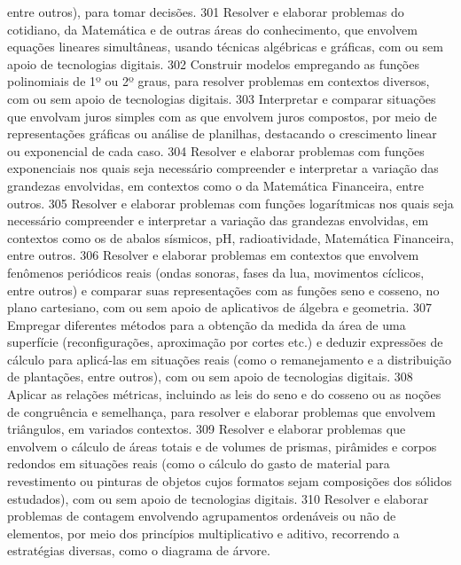 {{{				entre outros), para tomar decisões.
			}{301}{%
				Resolver e elaborar problemas do cotidiano, da Matemática e de outras
				áreas do conhecimento, que envolvem equações lineares simultâneas, usando técnicas
				algébricas e gráficas, com ou sem apoio de tecnologias digitais.
			}{302}{%
				Construir modelos empregando as funções polinomiais de 1º ou 2º
				graus,
				para resolver problemas em contextos diversos, com ou sem apoio de tecnologias digitais.
			}{303}{%
				Interpretar e comparar situações que envolvam juros simples com as que
				envolvem juros compostos, por meio de representações gráficas ou análise de planilhas,
				destacando o crescimento linear ou exponencial de cada caso.
			}{304}{%
				Resolver e elaborar problemas com funções exponenciais nos quais seja
				necessário compreender e interpretar a variação das grandezas
				envolvidas, em contextos
				como o da Matemática Financeira, entre outros.
			}{305}{%
				Resolver e elaborar problemas com funções logarítmicas nos quais seja
				necessário compreender e interpretar a variação das grandezas
				envolvidas, em contextos
				como os de abalos sísmicos, pH, radioatividade, Matemática Financeira, entre outros.
			}{306}{%
				Resolver e elaborar problemas em contextos que envolvem fenômenos
				periódicos reais (ondas sonoras, fases da lua, movimentos cíclicos, entre outros) e
				comparar suas representações com as funções seno e cosseno, no plano cartesiano, com
				ou sem apoio de aplicativos de álgebra e geometria.
			}{307}{%
				Empregar diferentes métodos para a obtenção da medida da área de
				uma superfície (reconfigurações, aproximação por cortes etc.) e deduzir expressões de
				cálculo para aplicá-las em situações reais (como o remanejamento e a distribuição de
				plantações, entre outros), com ou sem apoio de tecnologias digitais.
			}{308}{%
				Aplicar as relações métricas, incluindo as leis do seno e do cosseno ou as
				noções de congruência e semelhança, para resolver e elaborar problemas que envolvem
				triângulos, em variados contextos.
			}{309}{%
				Resolver e elaborar problemas que envolvem o cálculo de áreas totais e
				de volumes de prismas, pirâmides e corpos redondos em situações reais (como o cálculo
				do gasto de material para revestimento ou pinturas de objetos cujos formatos sejam
				composições dos sólidos estudados), com ou sem apoio de tecnologias digitais.
			}{310}{%
				Resolver e elaborar problemas de contagem envolvendo agrupamentos
				ordenáveis ou não de elementos, por meio dos princípios multiplicativo e aditivo,
				recorrendo a estratégias diversas, como o diagrama de árvore.
}}}
